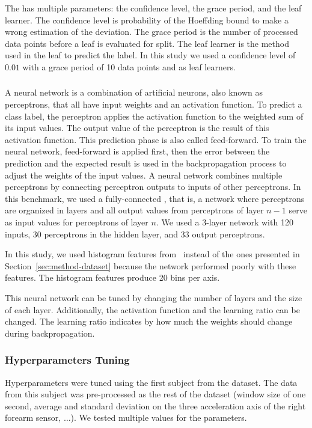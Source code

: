 The \hoeffdingtree has multiple parameters: the
confidence level, the grace period, and the leaf
learner. The confidence level is probability of
the Hoeffding bound to make a wrong estimation of
the deviation. The grace period is the number of
processed data points before a leaf is evaluated for split.
 The leaf learner is the method used in the
leaf to predict the label.  In this study we used
a confidence level of $0.01$ with a grace period
of 10 data points and \naivebayes as leaf
learners.

\subsubsection{\FNN}
A neural network is a combination of artificial
neurons, also known as perceptrons, that all have input weights and an
activation function. To predict a class label, the
perceptron applies the activation function to the weighted sum
of its input values. The output
value of the perceptron is the result of this
activation function. This prediction phase is also
called feed-forward. To train the neural network,
feed-forward is applied first, then the error between the
prediction and the expected result is used in the
backpropagation process to adjust the weights of
the input values.  A neural network combines
multiple perceptrons by connecting perceptron outputs
to inputs of other perceptrons.  In
this benchmark, we used a fully-connected \FNN, 
that is, a network where perceptrons are organized in
layers and all output
values from perceptrons of layer $n-1$ serve as
input values for perceptrons of layer $n$. 
We used a 3-layer network with 120 inputs, 30
perceptrons in the hidden layer, and 33 output
perceptrons.

In this study, we used histogram features
from~\cite{omid_2019} instead of the ones
presented in Section~\ref{sec:method-dataset}
because the network performed
poorly with these features. The histogram features
produce 20 bins per axis.

This neural network can be tuned by changing the
number of layers and the size of each layer.
Additionally, the activation function and the
learning ratio can be changed. The learning ratio
indicates by how much the weights should change
during backpropagation.


\subsubsection{Hyperparameters Tuning}
Hyperparameters were tuned using the first
subject from the \banosdataset dataset.  The data from
this subject was pre-processed as the rest of
the \banosdataset dataset (window size of one second,
average and standard deviation on the three
acceleration axis of the right forearm sensor,
$\ldots$). We tested multiple values for the
parameters.

